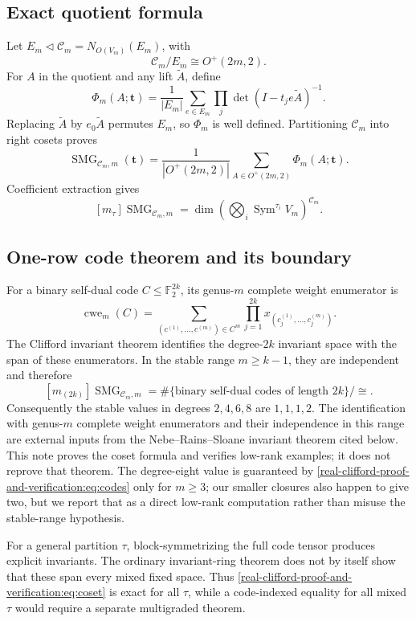 \documentclass[10pt]{article}
\newcommand{\SMG}{\operatorname{SMG}}
\newcommand{\MGF}{\SMG}
\begin{document}
\subsection{Exact quotient formula}
Let $E_m\triangleleft\mathcal C_m=N_{O(V_m)}(E_m)$, with
\[
 \mathcal C_m/E_m\cong O^+(2m,2).
\]
For $A$ in the quotient and any lift $\widetilde A$, define
\[
 \Phi_m(A;\mathbf t)=\frac1{|E_m|}\sum_{e\in E_m}
 \prod_j\det(I-t_je\widetilde A)^{-1}.
\]
Replacing $\widetilde A$ by $e_0\widetilde A$ permutes $E_m$, so $\Phi_m$
is well defined.  Partitioning $\mathcal C_m$ into right cosets proves
\begin{equation}\label{real-clifford-proof-and-verification:eq:coset}
\boxed{\MGF_{\mathcal C_m,m}(\mathbf t)=
\frac1{|O^+(2m,2)|}\sum_{A\in O^+(2m,2)}\Phi_m(A;\mathbf t).}
\end{equation}
Coefficient extraction gives
\[
[m_\tau]\MGF_{\mathcal C_m,m}=
\dim\left(\bigotimes_i\operatorname{Sym}^{\tau_i}V_m\right)^{\mathcal C_m}.
\]

\subsection{One-row code theorem and its boundary}
For a binary self-dual code $C\leq\mathbb F_2^{2k}$, its genus-$m$
complete weight enumerator is
\[
 \operatorname{cwe}_m(C)=\sum_{(c^{(1)},\ldots,c^{(m)})\in C^m}
 \prod_{j=1}^{2k}x_{(c_j^{(1)},\ldots,c_j^{(m)})}.
\]
The Clifford invariant theorem identifies the degree-$2k$ invariant space
with the span of these enumerators.  In the stable range $m\geq k-1$, they
are independent and therefore
\begin{equation}\label{real-clifford-proof-and-verification:eq:codes}
 [m_{(2k)}]\MGF_{\mathcal C_m,m}
 =\#\{\text{binary self-dual codes of length }2k\}/\!\cong.
\end{equation}
Consequently the stable values in degrees $2,4,6,8$ are $1,1,1,2$.
The identification with genus-$m$ complete weight enumerators and their
independence in this range are external inputs from the
Nebe--Rains--Sloane invariant theorem cited below.  This note proves the coset
formula and verifies low-rank examples; it does not reprove that theorem.
The degree-eight value is guaranteed by \eqref{real-clifford-proof-and-verification:eq:codes} only for $m\geq3$;
our smaller closures also happen to give two, but we report that as a direct
low-rank computation rather than misuse the stable-range hypothesis.

For a general partition $\tau$, block-symmetrizing the full code tensor
produces explicit invariants.  The ordinary invariant-ring theorem does not
by itself show that these span every mixed fixed space.  Thus \eqref{real-clifford-proof-and-verification:eq:coset}
is exact for all $\tau$, while a code-indexed equality for all mixed $\tau$
would require a separate multigraded theorem.
\end{document}
